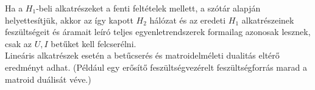 Ha a $H_{1}$-beli alkatrészeket a fenti feltételek mellett, a szótár alapján helyettesítjük, akkor az így kapott $H_{2}$ hálózat és az eredeti $H_{1}$ alkatrészeinek feszültségeit és áramait leíró teljes egyenletrendszerek formailag azonosak lesznek, csak az $U,I$ betűket kell felcserélni.\\
\newline
Lineáris alkatrészek esetén a betűcserés és matroidelméleti dualitás eltérő eredményt adhat. (Például egy erősítő feszültségvezérelt feszültségforrás marad a matroid duálisát véve.)